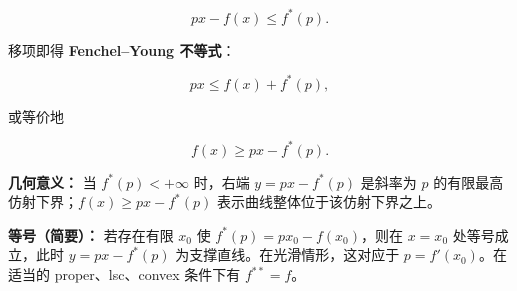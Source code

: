 \documentclass[
    lang=cn,
    color=blue,
    mode=fancy,
    thmcnt=section,
    scheme=chinese
]{elegantbook}
\begin{document}
\[
px - f(x) \le f^*(p).
\]

移项即得 \textbf{Fenchel–Young 不等式}：

\[
px \le f(x) + f^*(p),
\]

或等价地

\[
f(x) \ge px - f^*(p).
\]

\textbf{几何意义：} 当 $f^*(p)<+\infty$ 时，右端 $y=px-f^*(p)$ 是斜率为 $p$ 的有限最高仿射下界；$f(x)\ge px-f^*(p)$ 表示曲线整体位于该仿射下界之上。

\textbf{等号（简要）：} 若存在有限 $x_0$ 使 $f^*(p)=p x_0-f(x_0)$，则在 $x=x_0$ 处等号成立，此时 $y=px-f^*(p)$ 为支撑直线。在光滑情形，这对应于 $p=f'(x_0)$。在适当的 proper、lsc、convex 条件下有 $f^{**}=f$。

\par
\end{document}
